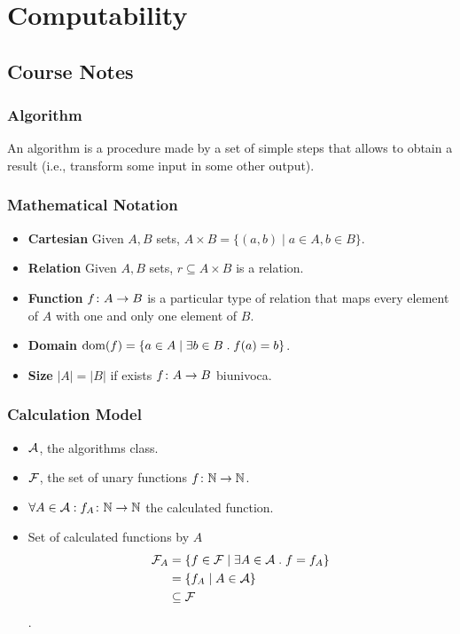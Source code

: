 \documentclass[12pt,a4paper,oneside]{book}
\begin{document}
\chapter{Computability}

\section{Course Notes}

\subsection{Algorithm} 

An algorithm is a procedure made by a set of simple steps that allows to obtain a result (i.e., transform some input in some other output).

\subsection{Mathematical Notation}

\begin{itemize}
    \item \textbf{Cartesian} Given $A, B$ sets, $A \times B = \{ (a,b) \mid a \in A, b \in B\}$.
    \item \textbf{Relation} Given $A, B$ sets, $r \subseteq A \times B$ is a relation.
    \item \textbf{Function} $\mathord{f}\colon A\to B$ is a particular type of relation that maps every element of $A$ with one and only one element of $B$.
    \item \textbf{Domain} $\mathop{\mathrm{dom}}\nolimits(f) = \{ a \in A \mid \exists b \in B \mathrel{.} f(a) = b \}$.
    \item \textbf{Size} $|A| = |B|$ if exists $\mathord{f}\colon A\to B$ biunivoca. 
\end{itemize}

\subsection{Calculation Model}

\begin{itemize}
    \item $\mathcal{A}$, the algorithms class.
    \item $\mathcal{F}$, the set of unary functions $\mathord{f}\colon\mathbb{N}\to\mathbb{N}$.
    \item $\forall A \in \mathcal{A} \mathrel{:} \mathord{f_A}\colon\mathbb{N}\to\mathbb{N}$ the calculated function.
    \item Set of calculated functions by $A$ 
    \begin{align*}
        \mathcal{F}_A &= \{ f \in \mathcal{F} \mid \exists A \in \mathcal{A} \mathrel{.} f = f_A \} \\ 
          &= \{ f_A \mid A \in \mathcal{A} \} \\
          &\subseteq \mathcal{F}
    \end{align*}.
\end{itemize}
\end{document}
